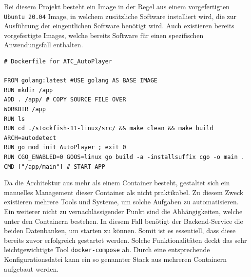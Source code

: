 Bei diesem Projekt besteht ein Image in der Regel aus einem
vorgefertigten \passthrough{\lstinline!Ubuntu 20.04!} Image, in welchem
zusätzliche Software installiert wird, die zur Ausführung der
eingentlichen Software benötigt wird. Auch existieren bereits
vorgefertigte Images, welche bereits Software für einen spezifischen
Anwendungsfall enthalten.

\begin{lstlisting}
# Dockerfile for ATC_AutoPlayer

FROM golang:latest #USE golang AS BASE IMAGE
RUN mkdir /app
ADD . /app/ # COPY SOURCE FILE OVER
WORKDIR /app
RUN ls
RUN cd ./stockfish-11-linux/src/ && make clean && make build ARCH=autodetect
RUN go mod init AutoPlayer ; exit 0
RUN CGO_ENABLED=0 GOOS=linux go build -a -installsuffix cgo -o main .
CMD ["/app/main"] # START APP
\end{lstlisting}

Da die Architektur aus mehr als einem Container besteht, gestaltet sich
ein manuelles Management dieser Container als nicht praktikabel. Zu
diesem Zweck existieren mehrere Tools und Systeme, um solche Aufgaben zu
automatisieren. Ein weiterer nicht zu vernachlässigender Punkt sind die
Abhängigkeiten, welche unter den Containern bestehen. In diesem Fall
benötigt der Backend-Service die beiden Datenbanken, um starten zu
können. Somit ist es essentiell, dass diese bereits zuvor erfolgreich
gestartet werden. Solche Funktionalitäten deckt das sehr
leichtgewichtigte Tool \passthrough{\lstinline!docker-compose!}
\cite{dockercompose} ab. Durch eine entsprechende
Konfigurationsdatei kann ein so genannter Stack aus mehreren Containern
aufgebaut werden.

